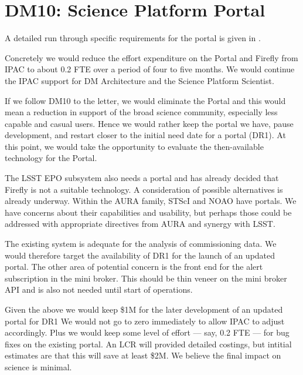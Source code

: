 \section{DM10: Science Platform Portal}\label{sect:dm10}

A detailed run through specific requirements for the portal is given in .

Concretely we would reduce the effort expenditure on the Portal and Firefly from IPAC to about 0.2 FTE over a period of four to five months.
We would continue the IPAC support for DM Architecture and the Science Platform Scientist.

If we follow DM10 to the letter, we would eliminate the Portal and this would mean a reduction in support of the broad science community, especially less capable and casual users.
Hence we would rather keep the portal we have, pause development, and restart closer to the initial need date for a portal (DR1).
At this point, we would take the opportunity to evaluate the then-available technology for the Portal.

The LSST EPO subsystem also needs a portal and has already decided that
Firefly is not a suitable technology. A consideration of possible alternatives
is already underway.
Within the AURA family, STScI and NOAO have portals.
We have concerns about their capabilities and usability, but perhaps those could be addressed with appropriate directives from AURA and synergy with LSST.

The existing system is adequate for the analysis of commissioning data.
We would therefore target the availability of DR1 for the launch of an updated
portal.
The other area of potential concern is the front end for the alert subscription in the mini broker.
This should be thin veneer on the mini broker API and is also not needed until start of operations.

Given the above  we would keep \$1M for the later development of an updated portal for DR1
We would not go to zero immediately to allow IPAC to adjust accordingly.
Plus we would keep some level of effort --- say, 0.2 FTE --- for bug fixes on the existing portal.
An LCR will provided detailed costings, but intitial estimates are that this will save at least \$2M.
We believe the final impact on science is minimal.
